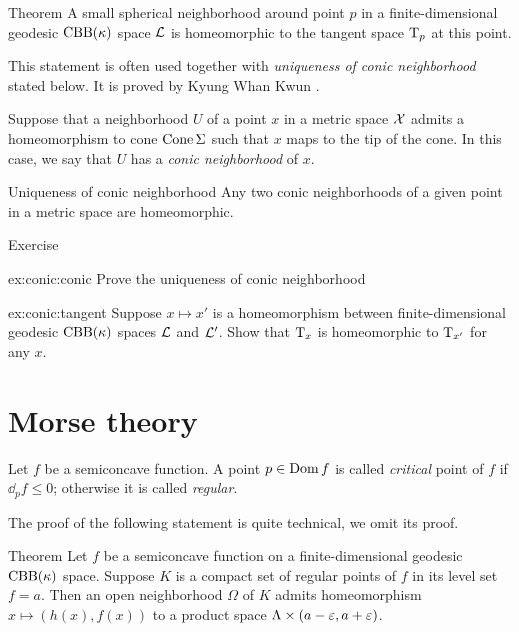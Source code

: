 \begin{thm}{Theorem}\label{thm:spherical-nbhd}
A small spherical neighborhood around point $p$ in a finite-dimensional geodesic $\mathrm{CBB}(\kappa)$ space $\mathcal{L}$
is homeomorphic to the tangent space $\mathrm{T}_p$ at this point.
\end{thm}

This statement is often used together with \emph{uniqueness of conic neighborhood} stated below.
It is proved by Kyung Whan Kwun \cite{kwun1964}.

Suppose that a neighborhood $U$ of a point $x$ in a metric space $\mathcal{X}$
admits a homeomorphism to cone $\mathop{\rm Cone}\nolimits\Sigma$ such that $x$ maps to the tip of the cone.
In this case, we say that $U$ has a \emph{conic neighborhood} of $x$.

\begin{thm}{Uniqueness of conic neighborhood}\label{lem:kwun}
Any two conic neighborhoods of a given point in a metric space are homeomorphic.
\end{thm}

\begin{thm}{Exercise}\label{ex:conic}

\begin{subthm}{ex:conic:conic}
Prove the uniqueness of conic neighborhood
\end{subthm}

\begin{subthm}{ex:conic:tangent}
Suppose $x\mapsto x'$ is a homeomorphism between finite-dimensional geodesic $\mathrm{CBB}(\kappa)$ spaces $\mathcal{L}$ and $\mathcal{L}'$.
Show that $\mathrm{T}_x$ is homeomorphic to $\mathrm{T}_{x'}$ for any $x$.
\end{subthm}

\end{thm}


\section{Morse theory}

Let $f$ be a semiconcave function.
A point $p\in \mathop{\rm Dom}\nolimits f$ is called \emph{critical} point of $f$ if $\dd_pf\le 0$; 
otherwise it is called \emph{regular}.

The proof of the following statement is quite technical, we omit its proof.

\begin{thm}{Theorem}
Let $f$ be a semiconcave function on a finite-dimensional geodesic $\mathrm{CBB}(\kappa)$ space.
Suppose $K$ is a compact set of regular points of $f$ in its level set $f=a$.
Then an open neighborhood $\Omega$ of $K$ admits homeomorphism $x\mapsto (h(x),f(x))$ to a product space $\Lambda\times (a-\varepsilon,a+\varepsilon)$.

\end{thm}

